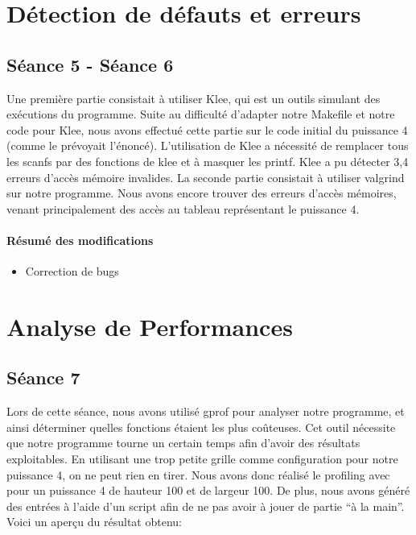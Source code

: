 \documentclass{article}
\begin{document}
\section{Détection de défauts et erreurs}
\subsection{Séance 5 - Séance 6}

Une première partie consistait à utiliser Klee, qui est un outils simulant des exécutions du programme. Suite au difficulté d'adapter notre Makefile et notre code pour Klee, nous avons effectué cette partie sur le code initial du puissance 4 (comme le prévoyait l'énoncé). L'utilisation de Klee a nécessité de remplacer tous les scanfs par des fonctions de klee et à masquer les printf. Klee a pu détecter 3,4 erreurs d'accès mémoire invalides.
La seconde partie consistait à utiliser valgrind sur notre programme. Nous avons encore trouver des erreurs d'accès mémoires, venant principalement des accès au tableau représentant le puissance 4.

\paragraph{Résumé des modifications}
\begin{itemize}
\item Correction de bugs
\end{itemize}

\section{Analyse de Performances}
\subsection{Séance 7}
Lors de cette séance, nous avons utilisé gprof pour analyser notre programme, et ainsi déterminer quelles fonctions étaient les plus coûteuses. Cet outil nécessite que notre programme tourne un certain temps afin d'avoir des résultats exploitables. En utilisant une trop petite grille comme configuration pour notre puissance 4, on ne peut rien en tirer. Nous avons donc réalisé le profiling avec pour un puissance 4 de hauteur 100 et de largeur 100. De plus, nous avons généré des entrées à l'aide d'un script afin de ne pas avoir à jouer de partie ``à la main''. Voici un aperçu du résultat obtenu:
\end{document}
